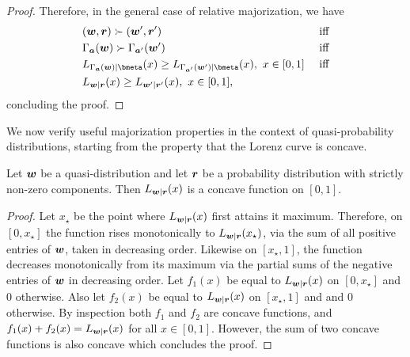 \documentclass[pra,
aps,
twocolumn,
superscriptaddress,
groupedaddress,
nofootinbib,
reprint
]{revtex4-1}
\begin{document}
{\begin{proof}
Therefore, in the general case of relative majorization, we have
\begin{align}
	&(\w, \r) \succ (\w', \r') &\mbox{ iff} \nonumber\\
	&\Gamma_{\bma} (\w) \succ \Gamma_{\bma'} (\w') &\mbox{ iff} \nonumber\\
	&L_{\Gamma_{\bma} (\w) | \bmeta}(x) \geq L_{\Gamma_{\bma'} (\w') | \bmeta}(x),\ x \in [0,1] &\mbox{ iff} \nonumber\\
	&L_{\w | \r}(x) \geq L_{\w' | \r'}(x),\ x \in [0,1],
\end{align}
concluding the proof.
\end{proof}
}

We now verify useful majorization properties in the context of quasi-probability distributions, starting from the property that the Lorenz curve is concave.
\begin{proposition}\label{L-concave} 
	Let $\boldsymbol{w}$ be a quasi-distribution and let $\boldsymbol{r}$ be a probability distribution with strictly non-zero components. Then $L_{\boldsymbol{w}|\boldsymbol{r}}(x)$ is a concave function on $[0,1]$.
\end{proposition}
\begin{proof} 
	Let $x_\star$ be the point where $L_{\boldsymbol{w}|\boldsymbol{r}}(x)$ first attains it maximum. Therefore, on $[0,x_\star]$ the function rises monotonically to $L_{\boldsymbol{w}|\boldsymbol{r}}(x_\star)$, via the sum of all positive entries of $\boldsymbol{w}$, taken in decreasing order. Likewise on $[x_\star, 1]$, the function decreases monotonically from its maximum via the partial sums of the negative entries of $\boldsymbol{w}$ in decreasing order. Let $f_1(x)$ be equal to $L_{\boldsymbol{w}|\boldsymbol{r}}(x)$ on $[0, x_\star]$ and $0$ otherwise. Also let $f_2(x)$ be equal to $L_{\boldsymbol{w}|\boldsymbol{r}}(x)$ on $[x_\star,1]$ and and $0$ otherwise. By inspection both $f_1$ and $f_2$ are concave functions, and $f_1(x) + f_2 (x) = L_{\boldsymbol{w}|\boldsymbol{r}}(x)$ for all $x\in [0,1]$. However, the sum of two concave functions is also concave which concludes the proof.
\end{proof}
\end{document}
